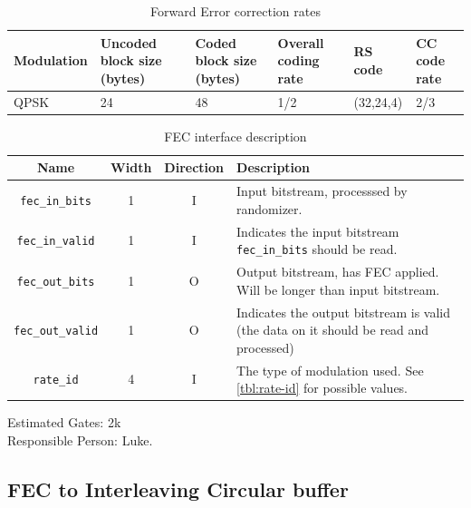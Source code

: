 \documentclass[dvips,10pt,twocolumn]{article}
\begin{document}
	\begin{table}
		\begin{tabularx}{\textwidth}{X|X|X|X|X|X}
		\label{tbl:fec-param}
			Modulation & Uncoded block size (bytes) &
			Coded block size (bytes) & Overall coding
			rate & RS code & CC code rate \\ \hline
			QPSK & 24 & 48 & 1/2 & (32,24,4) & 2/3 \\
		\end{tabularx}
		\caption{Forward Error correction rates}
	\end{table}

	\begin{table} \begin{tabularx}{\textwidth}{c|c|c|X}
		\label{tbl:fec-io}
		Name & Width & Direction & Description \\ \hline

		\texttt{fec\_in\_bits} & 1 & I & Input bitstream, processsed by randomizer.
		\\

		\texttt{fec\_in\_valid} & 1 & I & Indicates the input bitstream
		\texttt{fec\_in\_bits} should be read.\\

		\texttt{fec\_out\_bits} & 1 & O & Output bitstream, has FEC
		applied. Will be longer than input bitstream. \\

		\texttt{fec\_out\_valid} & 1 & O & Indicates the output bitstream
		is valid (the data on it should be read and processed) \\

		\texttt{rate\_id} & 4 & I & The type of modulation used. See
		\autoref{tbl:rate-id} for possible values.

	\end{tabularx} \caption{FEC interface description} \end{table}

	Estimated Gates: 2k \\
	Responsible Person: Luke.

	\subsection{FEC to Interleaving Circular buffer}
	\label{sec:fec_buffer}
\end{document}
